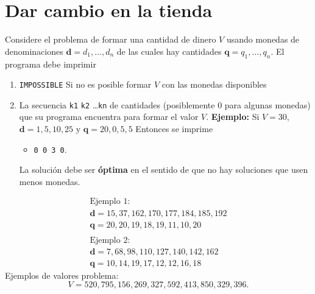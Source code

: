 \section{Dar cambio en la tienda}
Considere el problema de formar una cantidad de dinero $V$ usando monedas de
denominaciones
\( \mathbf{d}= d_1, \ldots, d_n  \) de las cuales hay cantidades
\( \mathbf{q}= q_1, \ldots, q_n  \).
El programa debe imprimir
\begin{enumerate}
	\item[Caso 1:] \texttt{IMPOSSIBLE} Si no es posible formar $V$ con las
		monedas disponibles
	\item[Caso 2:] La secuencia \texttt{k1} \texttt{k2} \ldots \texttt{kn}
		de cantidades (posiblemente 0 para algunas monedas) que su programa
		encuentra para formar el valor $V$. \textbf{Ejemplo:} Si $V= 30$,
		$\mathbf{d}= 1, 5, 10, 25$ y $\mathbf{q}= 20, 0, 5, 5$ Entonces se
		imprime
		\begin{itemize}
			\item[] \texttt{0 0 3 0}.
		\end{itemize}
		La solución debe ser \textbf{óptima} en el sentido de que no hay
		soluciones que usen menos monedas.
\end{enumerate}
\[
	\begin{array}{l}
		\mbox{Ejemplo 1:}\\
		\mathbf{d}= 15, 37, 162, 170, 177, 184, 185, 192\\ 
		\mathbf{q}= 20, 20, 19,  18,  19,  11,  10,  20\\
		 \\
		\mbox{Ejemplo 2:}\\
		\mathbf{d}= 7,  68, 98, 110, 127, 140, 142, 162\\ 
		\mathbf{q}= 10, 14, 19, 17,  12,  12,  16,  18
	\end{array}
\]
Ejemplos de valores problema:
\[ V= 520, 795, 156, 269, 327, 592, 413, 850, 329, 396.\]

